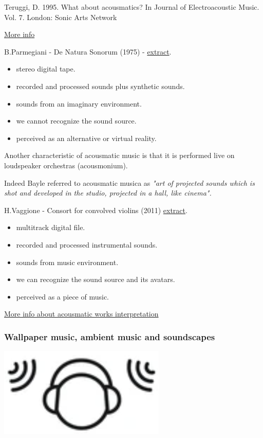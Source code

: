 Teruggi, D. 1995. What about acousmatics? In Journal of Electroacoustic
Music. Vol. 7. London: Sonic Arts Network

\href{img/teruggi.pdf}{More info}

B.Parmegiani - De Natura Sonorum (1975) - \href{https://github.com/musicaecodice/EMC/blob/main/2_instruments/suoni/parmegiani.mp3}{extract}.

\begin{itemize}
\tightlist
\item stereo digital tape.
\item recorded and processed sounds plus synthetic sounds.
\item sounds from an imaginary environment.
\item we cannot recognize the sound source.
\item perceived as an alternative or virtual reality.
\end{itemize}

Another characteristic of acousmatic music is that it is performed live on loudspeaker orchestras (acousmonium).

Indeed Bayle referred to acousmatic musica as \textit{"art of projected sounds which is shot and developed in the studio, projected in a hall, like cinema".}

H.Vaggione - Consort for convolved violins (2011) \href{https://github.com/musicaecodice/EMC/blob/main/2_instruments/suoni/vaggione.mp3}{extract}.

\begin{itemize}
\tightlist
\item multitrack digital file.
\item recorded and processed instrumental sounds.
\item sounds from music environment.
\item we can recognize the sound source and its avatars.
\item perceived as a piece of music.
\end{itemize}

\href{img/space.pdf}{More info about acousmatic works interpretation}

\subsubsection{Wallpaper music, ambient music and soundscapes }\label{wallpaper-music-ambient-music-and-soundscapes}

\begin{center}
\includegraphics[scale=0.4]{../img/ambi.png}
\end{center}

